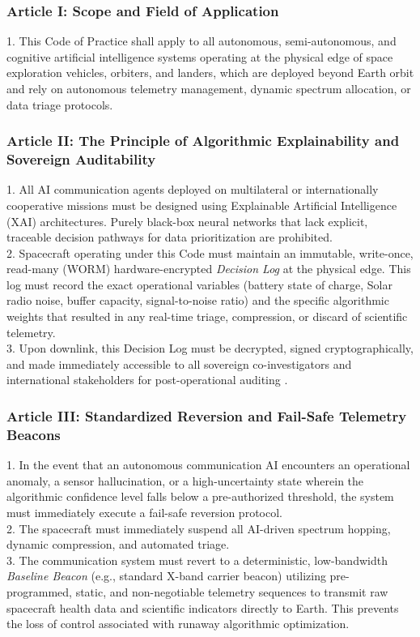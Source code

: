 \documentclass[final,5p,times,twocolumn]{elsarticle}
\begin{document}
\subsubsection*{Article I: Scope and Field of Application}
1. This Code of Practice shall apply to all autonomous, semi-autonomous, and cognitive artificial intelligence systems operating at the physical edge of space exploration vehicles, orbiters, and landers, which are deployed beyond Earth orbit and rely on autonomous telemetry management, dynamic spectrum allocation, or data triage protocols.

\subsubsection*{Article II: The Principle of Algorithmic Explainability and Sovereign Auditability}
1. All AI communication agents deployed on multilateral or internationally cooperative missions must be designed using Explainable Artificial Intelligence (XAI) architectures. Purely black-box neural networks that lack explicit, traceable decision pathways for data prioritization are prohibited. \\
2. Spacecraft operating under this Code must maintain an immutable, write-once, read-many (WORM) hardware-encrypted \textit{Decision Log} at the physical edge. This log must record the exact operational variables (battery state of charge, Solar radio noise, buffer capacity, signal-to-noise ratio) and the specific algorithmic weights that resulted in any real-time triage, compression, or discard of scientific telemetry. \\
3. Upon downlink, this Decision Log must be decrypted, signed cryptographically, and made immediately accessible to all sovereign co-investigators and international stakeholders for post-operational auditing \citep{liao2023xai}.

\subsubsection*{Article III: Standardized Reversion and Fail-Safe Telemetry Beacons}
1. In the event that an autonomous communication AI encounters an operational anomaly, a sensor hallucination, or a high-uncertainty state wherein the algorithmic confidence level falls below a pre-authorized threshold, the system must immediately execute a fail-safe reversion protocol. \\
2. The spacecraft must immediately suspend all AI-driven spectrum hopping, dynamic compression, and automated triage. \\
3. The communication system must revert to a deterministic, low-bandwidth \textit{Baseline Beacon} (e.g., standard X-band carrier beacon) utilizing pre-programmed, static, and non-negotiable telemetry sequences to transmit raw spacecraft health data and scientific indicators directly to Earth. This prevents the loss of control associated with runaway algorithmic optimization.
\end{document}
